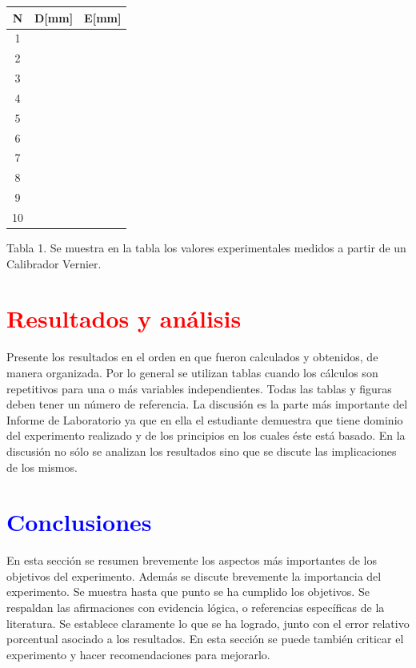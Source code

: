 \documentclass[11pt]{article}
\begin{document}
\begin{multicols}{2}
        \begin{center}
            \begin{tabular}{|c||c|c|}
                \hline
                N  & D[mm] & E[mm] \\[0,1cm]
                \hline \hline
                1  &       &       \\ \hline
                2  &       &       \\ \hline
                3  &       &       \\ \hline
                4  &       &       \\ \hline
                5  &       &       \\ \hline
                6  &       &       \\ \hline
                7  &       &       \\ \hline
                8  &       &       \\ \hline
                9  &       &       \\ \hline
                10 &       &       \\ \hline
            \end{tabular}
        \end{center}
        Tabla 1. Se muestra en la tabla los valores experimentales medidos a partir de un Calibrador Vernier.


        \section{\textbf{\textcolor{red}{Resultados y análisis}}}
        \noindent Presente los resultados en el orden en que fueron calculados y obtenidos, de manera organizada. Por lo general se utilizan tablas cuando los cálculos son repetitivos para una o más variables independientes. Todas las tablas y figuras deben tener un número de referencia. La discusión es la parte más importante del Informe de Laboratorio ya que en ella el estudiante demuestra que tiene dominio del experimento realizado y de los principios en los cuales éste está basado. En la discusión no sólo se analizan los resultados sino que se discute las implicaciones de los mismos.


        \section{\textbf{\textcolor{blue}{Conclusiones}}}
        \noindent En esta sección se resumen brevemente los aspectos más importantes de los objetivos del experimento. Además se discute brevemente la importancia del experimento. Se muestra hasta que punto se ha cumplido los objetivos. Se respaldan las afirmaciones con evidencia lógica, o referencias específicas de la literatura. Se establece claramente lo que se ha logrado, junto con el error relativo porcentual asociado a los resultados. En esta sección se puede también criticar el experimento y hacer recomendaciones para mejorarlo.



\end{multicols}
\end{document}
